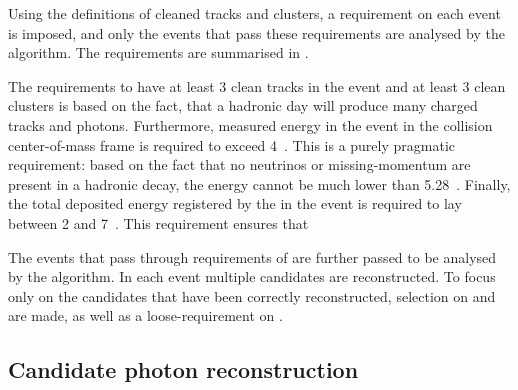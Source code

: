 Using the definitions of cleaned tracks and \ECL clusters, a requirement on each event is imposed, and only the events that pass these requirements are analysed by the \FEI algorithm.
The requirements are summarised in .

\begin{table}[htbp!]
    \centering
     \caption{\label{tab:fei_precuts} \FEI pre-selections.}
\end{table}
The requirements to have at least 3 clean tracks in the event and at least 3 clean \ECL clusters is based on the fact, that a hadronic day will produce many charged tracks and photons.
Furthermore, measured energy in the event in the \epem collision center-of-mass frame is required to exceed 4~\gev.
This is a purely pragmatic requirement: based on the fact that no neutrinos or missing-momentum are present in a hadronic decay, the energy cannot be much lower than 5.28~\gev.
Finally, the total deposited energy registered by the \ECL in the event is required to lay between 2 and 7~\gev.
This requirement ensures that

The events that pass through requirements of  are further passed to be analysed by the \FEI algorithm.
In each event multiple \FEI candidates are reconstructed.
To focus only on the candidates that have been correctly reconstructed, selection on \DeltaE and \Mbc are made, as well as a loose-requirement on \feiProb.

\subsection{Candidate photon reconstruction}\label{sec:gamma_reconstruction}

